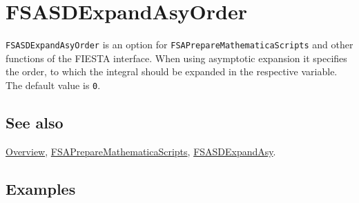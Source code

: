 \documentclass[../FeynHelpersManual.tex]{subfiles}
\begin{document}
\begin{Shaded}
\begin{Highlighting}[]
 
\end{Highlighting}
\end{Shaded}

\hypertarget{fsasdexpandasyorder}{
\section{FSASDExpandAsyOrder}\label{fsasdexpandasyorder}}

\texttt{FSASDExpandAsyOrder} is an option for
\texttt{FSAPrepareMathematicaScripts} and other functions of the FIESTA
interface. When using asymptotic expansion it specifies the order, to
which the integral should be expanded in the respective variable. The
default value is \texttt{0}.

\subsection{See also}

\hyperlink{toc}{Overview},
\hyperlink{fsapreparemathematicascripts}{FSAPrepareMathematicaScripts},
\hyperlink{fsasdexpandasy}{FSASDExpandAsy}.

\subsection{Examples}
\end{document}
